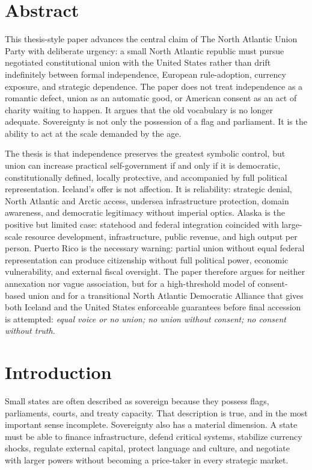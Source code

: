 \documentclass[11pt,a4paper]{article}
\newcommand{\PartyEN}{The North Atlantic Union Party}
\begin{document}
\section{Abstract}
This thesis-style paper advances the central claim of \PartyEN{} with deliberate urgency: a small North Atlantic republic must pursue negotiated constitutional union with the United States rather than drift indefinitely between formal independence, European rule-adoption, currency exposure, and strategic dependence. The paper does not treat independence as a romantic defect, union as an automatic good, or American consent as an act of charity waiting to happen. It argues that the old vocabulary is no longer adequate. Sovereignty is not only the possession of a flag and parliament. It is the ability to act at the scale demanded by the age.

The thesis is that independence preserves the greatest symbolic control, but union can increase practical self-government if and only if it is democratic, constitutionally defined, locally protective, and accompanied by full political representation. Iceland's offer is not affection. It is reliability: strategic denial, North Atlantic and Arctic access, undersea infrastructure protection, domain awareness, and democratic legitimacy without imperial optics. Alaska is the positive but limited case: statehood and federal integration coincided with large-scale resource development, infrastructure, public revenue, and high output per person. Puerto Rico is the necessary warning: partial union without equal federal representation can produce citizenship without full political power, economic vulnerability, and external fiscal oversight. The paper therefore argues for neither annexation nor vague association, but for a high-threshold model of consent-based union and for a transitional North Atlantic Democratic Alliance that gives both Iceland and the United States enforceable guarantees before final accession is attempted: \textit{equal voice or no union; no union without consent; no consent without truth.}

\section{Introduction}
Small states are often described as sovereign because they possess flags, parliaments, courts, and treaty capacity. That description is true, and in the most important sense incomplete. Sovereignty also has a material dimension. A state must be able to finance infrastructure, defend critical systems, stabilize currency shocks, regulate external capital, protect language and culture, and negotiate with larger powers without becoming a price-taker in every strategic market.
\end{document}
